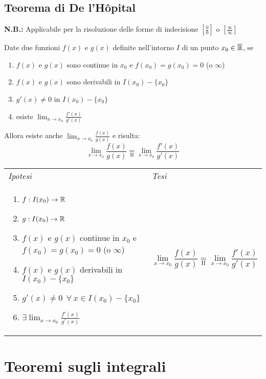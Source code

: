 \documentclass{article}     %
\begin{document}
    \subsection{Teorema di De l'Hôpital}
    \textbf{N.B.:} Applicabile per la risoluzione delle forme di indecisione $\left[\frac{0}{0}\right]$ o $\left[\frac{\infty}{\infty}\right]$
        \begin{shadedTheorem}[De l'Hôpital]
            Date due funzioni $f(x)$ e $g(x)$ definite nell'intorno $I$ di un punto $x_0\in \overline{\mathbb{R}}$, se
            \begin{enumerate}
                \item $f(x)$ e $g(x)$ sono continue in $x_0$ e $f(x_0)=g(x_0)=0$ (o $\infty$)
                \item $f(x)$ e $g(x)$ sono derivabili in $I(x_0)-\{x_0\}$ 
                \item $g'(x)\neq 0$ in $I(x_0)-\{x_0\}$
                \item esiste $\lim_{x\to x_0}\frac{f'(x)}{g'(x)}$
            \end{enumerate}
            Allora esiste anche $\lim_{x\to x_0}    \frac{f(x)}{g(x)}$ e risulta:
            \[\lim_{x\to x_0}\frac{f(x)}{g(x)}\underset{\mathrm{H}}{=}\lim_{x\to x_0}\frac{f'(x)}{g'(x)}\]
        \end{shadedTheorem}
        \begin{tabular}{m{}m{}}
            \textit{Ipotesi} & \textit{Tesi}  \\
            \begin{enumerate}
                \item $f: I(x_0)\to \mathbb{R}$
                \item $g: I(x_0)\to \mathbb{R}$
                \item $f(x)$ e $g(x)$ continue in $x_0$ e $f(x_0)=g(x_0)=0$ (o $\infty$)
                \item $f(x)$ e $g(x)$ derivabili in $I(x_0)-\{x_0\}$ 
                \item $g'(x)\neq 0 ~~\forall~ x \in I(x_0)-\{x_0\}$
                \item $\exists \lim_{x\to x_0}\frac{f'(x)}{g'(x)}$
            \end{enumerate} & \[\lim_{x\to x_0}\frac{f(x)}{g(x)}\underset{\mathrm{H}}{=}\lim_{x\to x_0}\frac{f'(x)}{g'(x)}\]
        \end{tabular}
    
\section{Teoremi sugli integrali}
\end{document}
